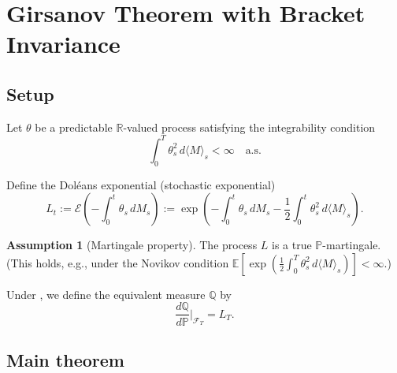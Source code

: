 \documentclass[11pt]{article}
\theoremstyle{plain}
\theoremstyle{definition}
\newtheorem{assumption}{Assumption}[section]
\theoremstyle{remark}
\newcommand{\R}{\mathbb{R}}
\newcommand{\E}{\mathbb{E}}
\newcommand{\F}{\mathcal{F}}
\newcommand{\PP}{\mathbb{P}}
\newcommand{\QQ}{\mathbb{Q}}
\newcommand{\bracket}[1]{\langle #1 \rangle}
\begin{document}
\section{Girsanov Theorem with Bracket Invariance}\label{sec:girsanov}

\subsection{Setup}

Let $\theta$ be a predictable $\R$-valued process satisfying the integrability
condition
\begin{equation}\label{eq:theta-int}
\int_0^T \theta_s^2\,d\bracket{M}_s < \infty \quad \text{a.s.}
\end{equation}

Define the Dol\'eans exponential (stochastic exponential)
\begin{equation}\label{eq:doleans}
L_t := \mathcal{E}\left(-\int_0^t \theta_s\,dM_s\right)
:= \exp\left(-\int_0^t \theta_s\,dM_s - \frac{1}{2}\int_0^t \theta_s^2\,d\bracket{M}_s\right).
\end{equation}

\begin{assumption}[Martingale property]\label{ass:novikov}
The process $L$ is a true $\PP$-martingale. (This holds, e.g., under the
Novikov condition $\E[\exp(\frac{1}{2}\int_0^T \theta_s^2\,d\bracket{M}_s)] < \infty$.)
\end{assumption}

Under , we define the equivalent measure $\QQ$ by
\begin{equation}\label{eq:Q-def}
\frac{d\QQ}{d\PP}\bigg|_{\F_T} = L_T.
\end{equation}

\subsection{Main theorem}
\end{document}
